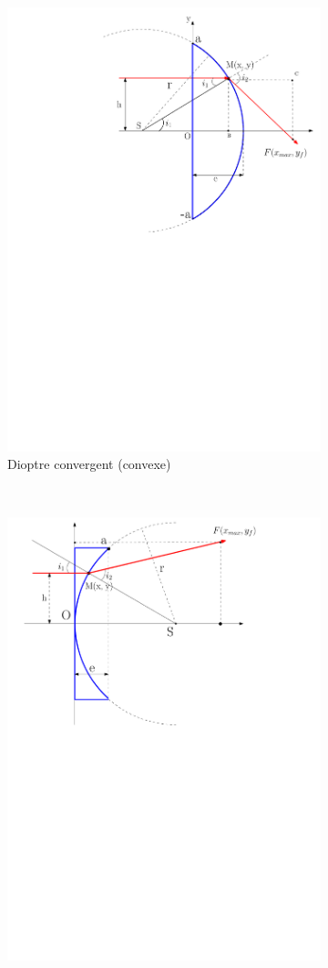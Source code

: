 \documentclass[a4paper,11pt]{article}
\begin{document}
\begin{figure}[H]
    \centering
    \begin{subfigure}[t]{0.45\linewidth}
    	\centering
		\includegraphics[width=0.8\linewidth]{Figures/schema_lent_conv.pdf}
		\caption{Dioptre convergent (convexe)}
		\label{fig:schema_lent_conv} 
    \end{subfigure}
    ~
    \begin{subfigure}[t]{0.45\linewidth}
    	\centering
		\includegraphics[width=0.8\linewidth]{Figures/schema_lent_div.pdf}

\end{subfigure}
\end{figure}
\end{document}
